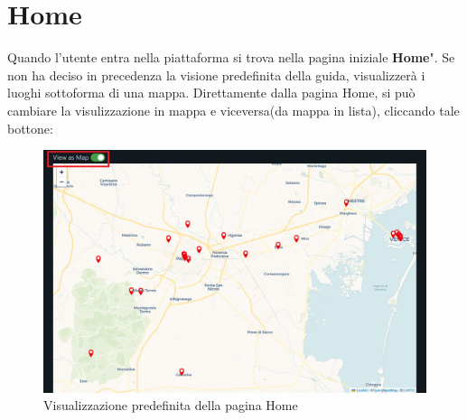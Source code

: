 \section{Home} {
    Quando l'utente entra nella piattaforma si trova nella pagina iniziale \textbf{Home}". \aCapo
    Se non ha deciso in precedenza la visione predefinita della guida, visualizzerà i luoghi sottoforma di una mappa. 
    Direttamente dalla pagina Home, si può cambiare la visulizzazione in mappa e viceversa(da mappa in lista), cliccando tale bottone:
    \begin{figure}[H]
        \includegraphics[width=12cm]{sezioni/images/home.png}
        \centering
        \caption{Visualizzazione predefinita della pagina Home}
    \end{figure}

}
